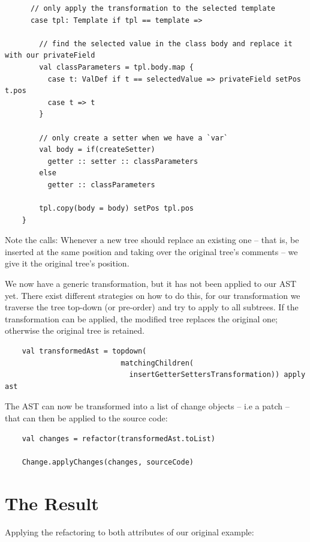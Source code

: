 \documentclass[10pt,a4paper,oneside]{scrreprt}
\begin{document}
{\begin{lstlisting}
      // only apply the transformation to the selected template
      case tpl: Template if tpl == template => 
      
        // find the selected value in the class body and replace it with our privateField
        val classParameters = tpl.body.map { 
          case t: ValDef if t == selectedValue => privateField setPos t.pos
          case t => t 
        }
      
        // only create a setter when we have a `var`
        val body = if(createSetter)  
          getter :: setter :: classParameters
        else
          getter :: classParameters
        
        tpl.copy(body = body) setPos tpl.pos
    }
\end{lstlisting}

Note the  calls: Whenever a new tree should replace an existing one -- that is, be inserted at the same position and taking over the original tree's comments -- we give it the original tree's position.

We now have a generic transformation, but it has not been applied to our AST yet. There exist different strategies on how to do this, for our transformation we traverse the tree top-down (or pre-order) and try to apply  to all subtrees. If the transformation can be applied, the modified tree replaces the original one; otherwise the original tree is retained.

\begin{lstlisting}
    val transformedAst = topdown(
                           matchingChildren(
                             insertGetterSettersTransformation)) apply ast
\end{lstlisting}
    
The AST can now be transformed into a list of change objects -- i.e a patch -- that can then be applied to the source code:

\begin{lstlisting}
    val changes = refactor(transformedAst.toList)
    
    Change.applyChanges(changes, sourceCode)
\end{lstlisting}

\section{The Result}

Applying the refactoring to both attributes of our original example:

}
\end{document}

